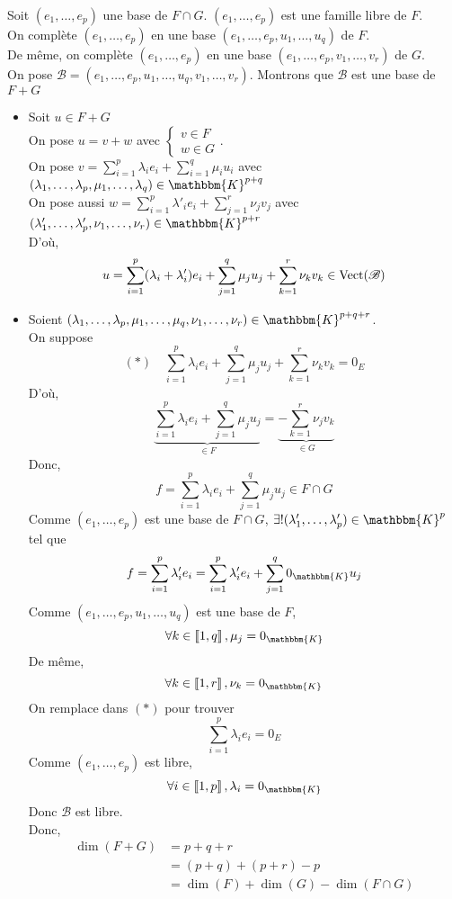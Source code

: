 \begin{prv}
	Soit $(e_1, \ldots, e_p)$ une base de $F\cap G$. $(e_1,\ldots,e_p)$ est une famille libre de $F$.\\
	On complète $(e_1, \ldots, e_p)$ en une base $(e_1, \ldots, e_p, u_1, \ldots, u_q)$ de $F$.\\
	De même, on complète $(e_1, \ldots, e_p)$ en une base $(e_1, \ldots, e_p, v_1, \ldots, v_r)$ de $G$.\\
	On pose  $\mathcal{B} = (e_1, \ldots, e_p, u_1, \ldots, u_q, v_1, \ldots, v_r)$. Montrons que $\mathcal{B}$ est une base de $F+G$
	\begin{itemize}
		\item Soit $u \in F+G$ \\
			On pose $u = v+w$ avec $\begin{cases}
				v\in F\\
				w \in G
			\end{cases}$.\\
			On pose $v = \sum_{i=1}^p \lambda_i e_i + \sum_{i=1}^q \mu_i u_i$ avec $(\lambda_1, \ldots, \lambda_p, \mu_1, \ldots, \lambda_q) \in \mathbbm{K}^{p+q}$\\
			On pose aussi $w = \sum_{i = 1}^p \lambda'_ie_i + \sum_{j=1}^r \nu_j v_j$ avec $(\lambda_1',\ldots,\lambda_p', \nu_1, \ldots, \nu_r) \in \mathbbm{K}^{p+r}$\\
			D'où, \[
				u = \sum_{i=1}^p (\lambda_i + \lambda'_i)e_i + \sum_{j=1}^q \mu_j u_j + \sum_{k=1}^r \nu_k v_k \in \operatorname{Vect}(\mathcal{B})
			\]
		\item Soient $(\lambda_1, \ldots, \lambda_p, \mu_1, \ldots, \mu_q, \nu_1, \ldots, \nu_r) \in \mathbbm{K}^{p+q+r}$.\\
			On suppose \[
				(*)\quad \sum_{i=1}^{p}\lambda_ie_i + \sum_{j=1}^q\mu_ju_j + \sum_{k=1}^r \nu_k v_k = 0_E
			\] 
			D'où, \[
				\underbrace{\sum_{i=1}^p\lambda_i e_i + \sum_{j=1}^q \mu_ju_j}_{\in F} = \underbrace{-\sum_{k=1}^r\nu_jv_k}_{\in G}
			\] 
			Donc, \[
				f = \sum_{i=1}^p \lambda_i e_i + \sum_{j=1}^q \mu_j u_j \in F\cap G
			\] Comme $(e_1, \ldots, e_p)$ est une base de $F\cap G$, $\exists ! (\lambda_1', \ldots, \lambda_p') \in \mathbbm{K}^p$ tel que \[
				f = \sum_{i=1}^p \lambda'_i e_i = \sum_{i=1}^p \lambda'_i e_i + \sum_{j=1}^q 0_\mathbbm{K}u_j
			\] Comme $(e_1, \ldots, e_p, u_1, \ldots, u_q)$ est une base de $F$, \[
				\forall k \in \left\llbracket 1, q \right\rrbracket, \mu_j = 0_\mathbbm{K}
			\] De même, \[
				\forall k \in \left\llbracket 1,r \right\rrbracket , \nu_k = 0_\mathbbm{K}
			\] On remplace dans $(*)$ pour trouver \[
				\sum_{i=1}^p \lambda_ie_i = 0_E
			\] Comme $(e_1, \ldots, e_p)$ est libre, \[
				\forall i \in \left\llbracket 1,p \right\rrbracket, \lambda_i = 0_\mathbbm{K}
			\] Donc $\mathcal{B}$ est libre.\\
			Donc, 
			\begin{align*}
				\dim(F+G) &=  p +q + r \\
				&= (p+q)+ (p+r) - p \\
				&= \dim(F) + \dim(G) - \dim(F\cap G) \\
			\end{align*}
	\end{itemize}
\end{prv}

